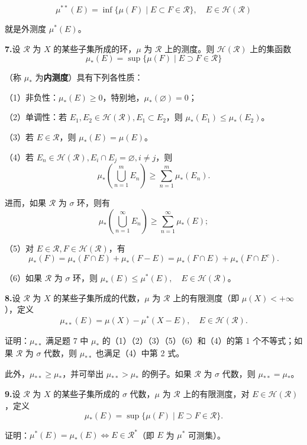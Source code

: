 \documentclass[11pt,a4paper]{article}
\begin{document}
\[\mu^{**}(E)=\inf\{\mu(F)\mid E\subset F\in\mathcal R\},\quad E\in\mathcal H(\mathcal R)\]
\par\noindent 就是外测度 $\mu^*(E)$。
\par{}\noindent\textbf{7.}\quad 设 $\mathcal R$ 为 $X$ 的某些子集所成的环，$\mu$ 为 $\mathcal R$ 上的测度。则 $\mathcal H(\mathcal R)$ 上的集函数
\[\mu_*(E)=\sup\{\mu(F)\mid E\supset F\in\mathcal R\}\]
\par\noindent （称 $\mu_*$ 为\textbf{内测度}）具有下列各性质：
\par\noindent （1）非负性：$\mu_*(E)\geq0$，特别地，$\mu_*(\varnothing)=0$；
\par\noindent （2）单调性：若 $E_1,E_2\in\mathcal H(\mathcal R),E_1\subset E_2$，则 $\mu_*(E_1)\leq\mu_*(E_2)$。
\par\noindent （3）若 $E\in\mathcal R$，则 $\mu_*(E)=\mu(E)$。
\par\noindent （4）若 $E_n\in\mathcal H(\mathcal R),E_i\cap E_j=\varnothing,i\ne j$，则
\[\mu_*\left(\bigcup_{n=1}^m E_n\right)\geq\sum_{n=1}^m\mu_*(E_n).\]
\par\noindent 进而，如果 $\mathcal R$ 为 $\sigma$ 环，则有
\[\mu_*\left(\bigcup_{n=1}^\infty E_n\right)\geq\sum_{n=1}^\infty\mu_*(E);\]
\par\noindent （5）对 $E\in\mathcal R,F\in\mathcal H(\mathcal R)$，有
\[\mu_*(F)=\mu_*(F\cap E)+\mu_*(F-E)=\mu_*(F\cap E)+\mu_*(F\cap E^c).\]
\par\noindent （6）如果 $\mathcal R$ 为 $\sigma$ 环，则 $\mu_*(E)\leq\mu^*(E),\quad E\in\mathcal H(\mathcal R)$。
\par{}\noindent\textbf{8.}\quad 设 $\mathcal R$ 为 $X$ 的某些子集所成的代数，$\mu$ 为 $\mathcal R$ 上的有限测度（即 $\mu(X)<+\infty$），定义
\[\mu_{**}(E)=\mu(X)-\mu^*(X-E),\quad E\in\mathcal H(\mathcal R).\]
\par\noindent 证明：$\mu_{**}$ 满足题 7 中 $\mu_*$ 的（1）（2）（3）（5）（6）和（4）的第 1 个不等式；如果 $\mathcal R$ 为 $\sigma$ 代数，则 $\mu_{**}$ 也满足（4）中第 2 式。
\par\noindent 此外，$\mu_{**}\geq\mu_*$，并可举出 $\mu_{**}>\mu_*$ 的例子。如果 $\mathcal R$ 为 $\sigma$ 代数，则 $\mu_{**}=\mu_*$。
\par{}\noindent\textbf{9.}\quad 设 $\mathcal R$ 为 $X$ 的某些子集所成的 $\sigma$ 代数，$\mu$ 为 $\mathcal R$ 上的有限测度，对 $E\in\mathcal H(\mathcal R)$，定义
\[\mu_*(E)=\sup\{\mu(F)\mid E\supset F\in\mathcal R\}.\]
\par\noindent 证明：$\mu^*(E)=\mu_*(E)\Leftrightarrow E\in\mathcal R^*$（即 $E$ 为 $\mu^*$ 可测集）。
\end{document}
